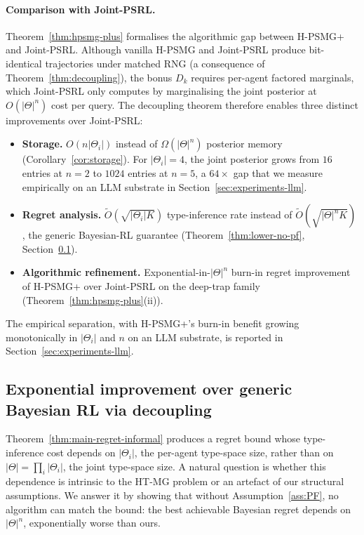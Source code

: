 \documentclass{article}
\def\textsuperscript#1{#1}%
\begin{document}
\paragraph{Comparison with Joint-PSRL.} Theorem~\ref{thm:hpsmg-plus} formalises the algorithmic gap between H-PSMG\textsuperscript{+} and Joint-PSRL. Although vanilla H-PSMG and Joint-PSRL produce bit-identical trajectories under matched RNG (a consequence of Theorem~\ref{thm:decoupling}), the bonus $D_k$ requires per-agent factored marginals, which Joint-PSRL only computes by marginalising the joint posterior at $O(|\Theta|^n)$ cost per query. The decoupling theorem therefore enables three distinct improvements over Joint-PSRL:
\begin{itemize}
\item \textbf{Storage.} $O(n|\Theta_i|)$ instead of $\Omega(|\Theta|^n)$ posterior memory (Corollary~\ref{cor:storage}). For $|\Theta_i| = 4$, the joint posterior grows from $16$ entries at $n=2$ to $1024$ entries at $n=5$, a $64\times$ gap that we measure empirically on an LLM substrate in Section~\ref{sec:experiments-llm}.
\item \textbf{Regret analysis.} $\tilde O(\sqrt{|\Theta_i| K})$ type-inference rate instead of $\tilde O(\sqrt{|\Theta|^n K})$, the generic Bayesian-RL guarantee (Theorem~\ref{thm:lower-no-pf}, Section~\ref{sec:exponential-improvement}).
\item \textbf{Algorithmic refinement.} Exponential-in-$|\Theta|^n$ burn-in regret improvement of H-PSMG\textsuperscript{+} over Joint-PSRL on the deep-trap family (Theorem~\ref{thm:hpsmg-plus}(ii)).
\end{itemize}
The empirical separation, with H-PSMG\textsuperscript{+}'s burn-in benefit growing monotonically in $|\Theta_i|$ and $n$ on an LLM substrate, is reported in Section~\ref{sec:experiments-llm}.

\subsection{Exponential improvement over generic Bayesian RL via decoupling}
\label{sec:exponential-improvement}

Theorem~\ref{thm:main-regret-informal} produces a regret bound whose type-inference cost depends on $|\Theta_i|$, the per-agent type-space size, rather than on $|\Theta| = \prod_i |\Theta_i|$, the joint type-space size. A natural question is whether this dependence is intrinsic to the HT-MG problem or an artefact of our structural assumptions. We answer it by showing that without Assumption~\ref{ass:PF}, no algorithm can match the bound: the best achievable Bayesian regret depends on $|\Theta|^n$, exponentially worse than ours.
\end{document}
